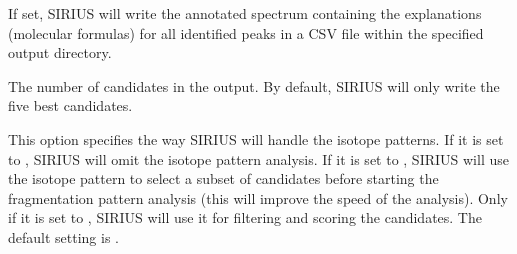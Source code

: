 \documentclass[letterpaper,10pt,openany,oneside]{sphinxmanual}
\begin{document}

\begin{fulllineitems}
\label{commandline:cmdoption-a}
If set, SIRIUS will write the annotated spectrum containing the explanations (molecular formulas) for all identified peaks in a CSV file within the specified output directory.

\end{fulllineitems}


\begin{fulllineitems}
\label{commandline:cmdoption-c}
The number of candidates in the output. By default, SIRIUS will only write the five best candidates.

\end{fulllineitems}


\begin{fulllineitems}
\label{commandline:cmdoption-s}
This option specifies the way SIRIUS will handle the isotope patterns. If it is set to , SIRIUS will omit the isotope pattern analysis. If it is set to , SIRIUS will use the isotope pattern to select a subset of candidates before starting the fragmentation pattern analysis (this will improve the speed of the analysis). Only if it is set to , SIRIUS will use it for filtering and scoring the candidates. The default setting is .

\end{fulllineitems}

\end{document}
